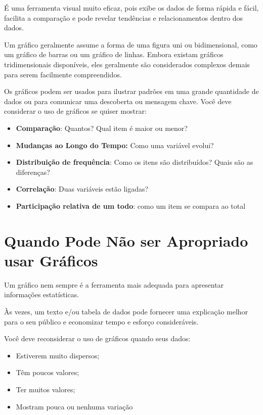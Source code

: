 É uma ferramenta visual muito eficaz, pois exibe os dados de forma rápida e fácil, facilita a comparação e pode revelar tendências e relacionamentos dentro dos dados.\vskip0.3cm  

Um gráfico geralmente assume a forma de uma figura uni ou bidimensional, como um gráfico de barras ou um gráfico de linhas. Embora existam gráficos tridimensionais disponíveis, eles geralmente são considerados complexos demais para serem facilmente compreendidos.\vskip0.3cm  

Os gráficos podem ser usados para ilustrar padrões em uma grande quantidade de dados ou para comunicar uma descoberta ou mensagem chave. Você deve considerar o uso de gráficos se quiser mostrar:

\begin{itemize}
    \item \textbf{Comparação}: Quantos? Qual item é maior ou menor?
    \item \textbf{Mudanças ao Longo do Tempo:} Como uma variável evolui?
    \item \textbf{Distribuição de frequência}: Como os itens são distribuídos? Quais são as diferenças?
    \item \textbf{Correlação}: Duas variáveis estão ligadas?
    \item \textbf{Participação relativa de um todo}: como um item se compara ao total
\end{itemize}

\newpage
\section{Quando Pode Não ser Apropriado usar Gráficos}

Um gráfico nem sempre é a ferramenta mais adequada para apresentar informações estatísticas. \vskip0.3cm

Às vezes, um texto e/ou tabela de dados pode fornecer uma explicação melhor para o seu público e economizar tempo e esforço consideráveis.\vskip0.3cm

Você deve reconsiderar o uso de gráficos quando seus dados: 

\begin{itemize}
\item Estiverem muito dispersos; 
\item Têm poucos valores; 
\item Ter muitos valores; 
\item Mostram pouca ou nenhuma variação
\end{itemize}

